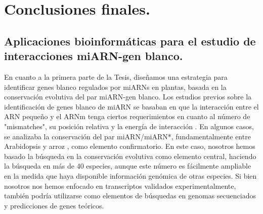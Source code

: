 \setcounter{chapter}{8}
\chapter*{Conclusiones finales.} 
\setcounter{figure}{0}
\setcounter{table}{0}
\setcounter{section}{0}


\graphicspath{{Chapter2/Figs/}}


\section{Aplicaciones bioinformáticas para el estudio de interacciones miARN-gen blanco.}

En cuanto a la primera parte de la Tesis, diseñamos una estrategia para identificar genes blanco regulados por miARNs en plantas, basada en la conservación evolutiva del par miARN-gen blanco.
Los estudios previos sobre la identificación de genes blanco de miARN se basaban en que la interacción entre el ARN pequeño y el ARNm tenga ciertos requerimientos en cuanto al número de "mismatches", su posición relativa y la energía de interacción \citep{pmid19167326,pmid12869753,pmid12242443}.
En algunos casos, se analizaba la conservación del par miARN/miARN*, fundamentalmente entre Arabidopsis y arroz \citep{15345049}, como elemento confirmatorio.
En este caso, nosotros hemos basado la búsqueda en la conservación evolutiva como elemento central, haciendo la búsqueda en más de 40 especies, aunque este número es fácilmente ampliable en la medida que haya disponible información genómica de otras especies.
Si bien nosotros nos hemos enfocado en transcriptos validados experimentalmente, también podría utilizarse como elementos de búsquedas en genomas secuenciados y predicciones de genes teóricos.

